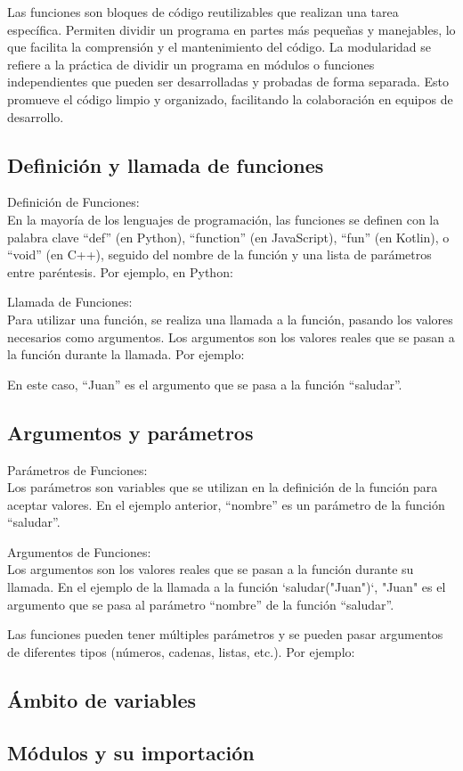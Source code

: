 
Las funciones son bloques de código reutilizables que realizan una tarea específica. Permiten dividir un programa en partes más pequeñas y manejables, lo que facilita la comprensión y el mantenimiento del código. La modularidad se refiere a la práctica de dividir un programa en módulos o funciones independientes que pueden ser desarrolladas y probadas de forma separada. Esto promueve el código limpio y organizado, facilitando la colaboración en equipos de desarrollo.

\subsection{Definición y llamada de funciones}

Definición de Funciones:\\
  
En la mayoría de los lenguajes de programación, las funciones se definen con la palabra clave ``def'' (en Python), ``function'' (en JavaScript), ``fun'' (en Kotlin), o ``void'' (en C++), seguido del nombre de la función y una lista de parámetros entre paréntesis. Por ejemplo, en Python:

Llamada de Funciones:\\

Para utilizar una función, se realiza una llamada a la función, pasando los valores necesarios como argumentos. Los argumentos son los valores reales que se pasan a la función durante la llamada. Por ejemplo:

En este caso, ``Juan'' es el argumento que se pasa a la función ``saludar''.

\subsection{Argumentos y parámetros}
Parámetros de Funciones:\\

Los parámetros son variables que se utilizan en la definición de la función para aceptar valores. En el ejemplo anterior, ``nombre'' es un parámetro de la función ``saludar''.

Argumentos de Funciones:\\

Los argumentos son los valores reales que se pasan a la función durante su llamada. En el ejemplo de la llamada a la función `saludar("Juan")`, "Juan" es el argumento que se pasa al parámetro ``nombre'' de la función ``saludar''.

Las funciones pueden tener múltiples parámetros y se pueden pasar argumentos de diferentes tipos (números, cadenas, listas, etc.). Por ejemplo:

\subsection{Ámbito de variables}
\subsection{Módulos y su importación}